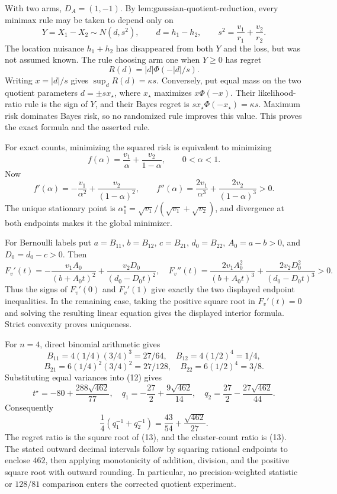 With two arms, \(D_A=(1,-1)\).  By \(\text{lem:gaussian-quotient-reduction}\), every minimax rule may be taken to depend only on
\[
Y=X_1-X_2\sim N(d,s^2),\qquad d=h_1-h_2,\qquad
s^2=\frac{v_1}{r_1}+\frac{v_2}{r_2}. \tag{11}
\]
The location nuisance \(h_1+h_2\) has disappeared from both \(Y\) and the loss, but was not assumed known.  The rule choosing arm one when \(Y\geq0\) has regret
\[
R(d)=|d|\Phi(-|d|/s).
\]
Writing \(x=|d|/s\) gives \(\sup_dR(d)=\kappa s\).  Conversely, put equal mass on the two quotient parameters \(d=\pm sx_\star\), where \(x_\star\) maximizes \(x\Phi(-x)\).  Their likelihood-ratio rule is the sign of \(Y\), and their Bayes regret is \(sx_\star\Phi(-x_\star)=\kappa s\).  Maximum risk dominates Bayes risk, so no randomized rule improves this value.  This proves the exact formula and the asserted rule.

For exact counts, minimizing the squared risk is equivalent to minimizing
\[
f(\alpha)=\frac{v_1}{\alpha}+\frac{v_2}{1-\alpha},\qquad0<\alpha<1.
\]
Now
\[
f'(\alpha)=-\frac{v_1}{\alpha^2}+\frac{v_2}{(1-\alpha)^2},\qquad
f''(\alpha)=\frac{2v_1}{\alpha^3}+\frac{2v_2}{(1-\alpha)^3}>0.
\]
The unique stationary point is \(\alpha_1^\star=\sqrt{v_1}/(\sqrt{v_1}+\sqrt{v_2})\), and divergence at both endpoints makes it the global minimizer.

For Bernoulli labels put \(a=B_{11}\), \(b=B_{12}\), \(c=B_{21}\), \(d_0=B_{22}\), \(A_0=a-b>0\), and \(D_0=d_0-c>0\).  Then
\[
F_v'(t)=-\frac{v_1A_0}{(b+A_0t)^2}+\frac{v_2D_0}{(d_0-D_0t)^2},
\quad
F_v''(t)=\frac{2v_1A_0^2}{(b+A_0t)^3}+\frac{2v_2D_0^2}{(d_0-D_0t)^3}>0. \tag{12}
\]
Thus the signs of \(F_v'(0)\) and \(F_v'(1)\) give exactly the two displayed endpoint inequalities.  In the remaining case, taking the positive square root in \(F_v'(t)=0\) and solving the resulting linear equation gives the displayed interior formula.  Strict convexity proves uniqueness.

For \(n=4\), direct binomial arithmetic gives
\[
B_{11}=4(1/4)(3/4)^3=27/64,\quad B_{12}=4(1/2)^4=1/4,
\]
\[
B_{21}=6(1/4)^2(3/4)^2=27/128,\quad B_{22}=6(1/2)^4=3/8.
\]
Substituting equal variances into (12) gives
\[
t^\star=-80+\frac{288\sqrt{462}}{77},
\quad q_1=-\frac{27}{2}+\frac{9\sqrt{462}}{14},
\quad q_2=\frac{27}{2}-\frac{27\sqrt{462}}{44}.
\]
Consequently
\[
\frac14\left(q_1^{-1}+q_2^{-1}\right)
=\frac{43}{54}+\frac{\sqrt{462}}{27}. \tag{13}
\]
The regret ratio is the square root of (13), and the cluster-count ratio is (13).  The stated outward decimal intervals follow by squaring rational endpoints to enclose \(462\), then applying monotonicity of addition, division, and the positive square root with outward rounding.  In particular, no precision-weighted statistic or \(128/81\) comparison enters the corrected quotient experiment.